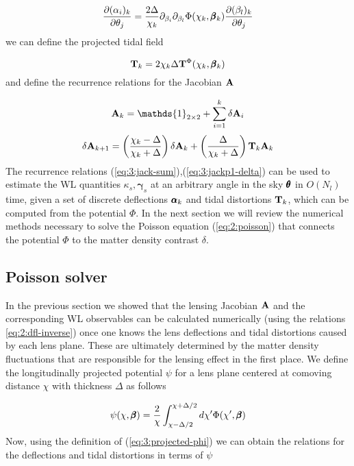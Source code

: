 \begin{equation}
\label{eq:3:Tk}
\frac{\partial (\alpha_i)_k}{\partial \theta_j} = \frac{2\Delta}{\chi_k}\partial_{\beta_i}\partial_{\beta_l}\Phi(\chi_k,\pmb{\beta}_k)\frac{\partial (\beta_l)_k}{\partial\theta_j}
\end{equation}
%
we can define the projected tidal field 

\begin{equation}
\label{eq:3:tidal-proj}
\mathbf{T}_k = 2\chi_k\Delta\mathbf{T}^\Phi(\chi_k,\pmb{\beta}_k) 
\end{equation}
%
and define the recurrence relations for the Jacobian $\mathbf{A}$

\begin{equation}
\label{eq:3:jack-sum}
\bb{A}_k = \mathds{1}_{2\times 2} + \sum_{i=1}^k\delta\bb{A}_i
\end{equation}
%
\begin{equation}
\label{eq:3:jackp1-delta}
\delta\mathbf{A}_{k+1} = \left(\frac{\chi_k-\Delta}{\chi_k+\Delta}\right)\delta\mathbf{A}_k + \left(\frac{\Delta}{\chi_k+\Delta}\right)\mathbf{T}_k\mathbf{A}_k
\end{equation} 
%
The recurrence relations (\ref{eq:3:jack-sum}),(\ref{eq:3:jackp1-delta}) can be used to estimate the WL quantities $\kappa_s,\pmb{\gamma}_s$ at an arbitrary angle in the sky $\pmb{\theta}$ in $O(N_l)$ time, given a set of discrete deflections $\pmb{\alpha}_k$ and tidal distortions $\mathbf{T}_k$, which can be computed from the potential $\Phi$. In the next section we will review the numerical methods necessary to solve the Poisson equation (\ref{eq:2:poisson}) that connects the potential $\Phi$ to the matter density contrast $\delta$. 

\subsection{Poisson solver}
In the previous section we showed that the lensing Jacobian $\mathbf{A}$ and the corresponding WL observables can be calculated numerically (using the relations \ref{eq:2:dfl-inverse}) once one knows the lens deflections and tidal distortions caused by each lens plane. These are ultimately determined by the matter density fluctuations that are responsible for the lensing effect in the first place. We define the longitudinally projected potential $\psi$ for a lens plane centered at comoving distance $\chi$ with thickness $\Delta$ as follows

\begin{equation}
\label{eq:3:projected-phi}
\psi(\chi,\pmb{\beta}) = \frac{2}{\chi}\int_{\chi-\Delta/2}^{\chi+\Delta/2}d\chi' \Phi(\chi',\pmb{\beta})
\end{equation} 
%
Now, using the definition of (\ref{eq:3:projected-phi}) we can obtain the relations for the deflections and tidal distortions in terms of $\psi$

